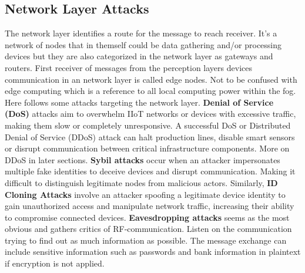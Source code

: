 \documentclass[article,a4paper]{IEEEtran}
\begin{document}
\subsection{Network Layer Attacks}
The network layer identifies a route for the message to reach receiver. It's a network of nodes that in themself could be data gathering and/or processing devices but they are also categorized in the network layer as gateways and routers. First receiver of messages from the perception layers devices communication in an network layer is called edge nodes. Not to be confused with edge computing which is a reference to all local computing power within the fog. Here follows some attacks targeting the network layer.   
\newline\newline
\textbf{Denial of Service (DoS)} attacks aim to overwhelm IIoT networks or devices with excessive traffic, making them slow or completely unresponsive. A successful DoS or Distributed Denial of Service (DDoS) attack can halt production lines, disable smart sensors or disrupt communication between critical infrastructure components. More on DDoS in later sections. 
\newline
\textbf{Sybil attacks} occur when an attacker impersonates multiple fake identities to deceive devices and disrupt communication. Making it difficult to distinguish legitimate nodes from malicious actors. Similarly, \textbf{ID Cloning Attacks} involve an attacker spoofing a legitimate device identity to gain unauthorized access and manipulate network traffic, increasing their ability to compromise connected devices. 
\newline
\textbf{Eavesdropping attacks} seems as the most obvious and gathers critics of RF-communication. Listen on the communication trying to find out as much information as possible. The message exchange can include sensitive information such as passwords and bank information in plaintext if encryption is not applied. 
\end{document}
